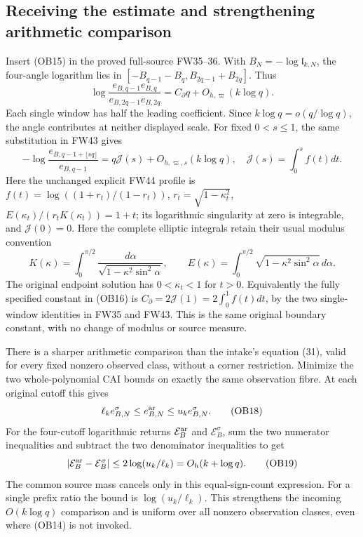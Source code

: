 \subsection{Receiving the estimate and strengthening arithmetic comparison}
Insert (OB15) in the proved full-source FW35--36. With
$B_N=-\log\mathfrak l_{k,N}$, the four-angle logarithm lies in
$[-B_{q-1}-B_q,B_{2q-1}+B_{2q}]$. Thus
\[
 \log\frac{e_{B,q-1}e_{B,q}}{e_{B,2q-1}e_{B,2q}}
 =C_\partial q+O_{h,\varpi}(k\log q).\tag{OB16}
\]
Each single window has half the leading coefficient. Since
$k\log q=o(q/\log q)$, the angle contributes at neither displayed
scale. For fixed $0<s\le1$, the same substitution in FW43 gives
\[
 -\log\frac{e_{B,q-1+\lfloor sq\rfloor}}{e_{B,q-1}}
 =q\mathcal J(s)+O_{h,\varpi,s}(k\log q),\quad
 \mathcal J(s)=\int_0^sf(t)dt.\tag{OB17}
\]
Here the unchanged explicit FW44 profile is
$f(t)=\log((1+r_t)/(1-r_t))$,
$r_t=\sqrt{1-\kappa_t^2}$,
$E(\kappa_t)/(r_tK(\kappa_t))=1+t$; its logarithmic singularity
at zero is integrable, and $\mathcal J(0)=0$.
Here the complete elliptic integrals retain their usual modulus
convention
\[
 K(\kappa)=\int_0^{\pi/2}\frac{d\alpha}{\sqrt{1-\kappa^2\sin^2\alpha}},
 \qquad E(\kappa)=\int_0^{\pi/2}\sqrt{1-\kappa^2\sin^2\alpha}\,d\alpha.
\]
The original endpoint solution has $0<\kappa_t<1$ for $t>0$.
Equivalently the fully specified constant in (OB16) is
$C_\partial=2\mathcal J(1)=2\int_0^1f(t)dt$, by the two
single-window identities in FW35 and FW43. This is the same original
boundary constant, with no change of modulus or source measure.

There is a sharper arithmetic comparison than the intake's equation
(31), valid for every fixed nonzero observed class, without a corner
restriction. Minimize the two whole-polynomial CAI bounds on exactly
the same observation fibre. At each original cutoff this gives
\[
 \ell_ke_{B,N}^\sigma\le e_{B,N}^{\rm ar}\le u_ke_{B,N}^\sigma.
 \tag{OB18}
\]
For the four-cutoff logarithmic returns $\mathcal E_B^{\rm ar}$ and
$\mathcal E_B^\sigma$, sum the two numerator inequalities and subtract
the two denominator inequalities to get
\[
 |\mathcal E_B^{\rm ar}-\mathcal E_B^\sigma|
 \le2\log(u_k/\ell_k)=O_h(k+\log q).\tag{OB19}
\]
The common source mass cancels only in this equal-sign-count expression.
For a single prefix ratio the bound is $\log(u_k/\ell_k)$. This
strengthens the incoming $O(k\log q)$ comparison and is uniform over
all nonzero observation classes, even where (OB14) is not invoked.

